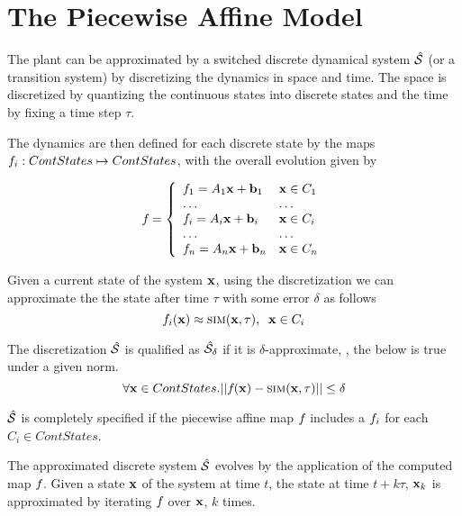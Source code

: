 \section{The Piecewise Affine Model}

The plant can be approximated by a switched discrete dynamical system
$\hat{\mathcal{S}}$ (or a transition system) by discretizing the dynamics in
space and time. The space is discretized by quantizing the continuous
states into discrete states and the time by fixing a time step $\tau$.

The dynamics are then defined for each discrete state by the maps
$f_{i}: ContStates \mapsto ContStates$, with the overall evolution
given by

\begin{equation}
    f_{} = \left\{
        \begin{array}{ll}
            f_{1} = A_1\mathbf{x} + \mathbf{b}_1 & \mathbf{x} \in C_1\\
            \ldots & \ldots\\
            f_{i} = A_i\mathbf{x} + \mathbf{b}_i & \mathbf{x} \in C_i\\
            \ldots & \ldots\\
            f_{n} = A_n\mathbf{x} + \mathbf{b}_n & \mathbf{x} \in C_n
        \end{array}
    \right.
\end{equation}

Given a current state of the system $\mathbf{x}$, using the discretization we
can approximate the the state after time $\tau$ with some error
$\delta$ as follows
\begin{equation}
    f_{i}(\mathbf{x}) \approx \mbox{\sc sim}(\mathbf{x}, \tau),\;\; \mathbf{x} \in C_i
\end{equation}

The discretization $\hat{\mathcal{S}}$ is qualified as $\hat{\mathcal{S}}_\delta$
if it is $\delta$-approximate, \ie, the below is true under a given
norm.
\begin{equation}
    \forall \mathbf{x} \in ContStates.
        ||f_{}(\mathbf{x}) - \mbox{\sc sim}(\mathbf{x}, \tau)|| \le \delta
\end{equation}

$\hat{\mathcal{S}}$ is completely specified if the piecewise affine map
$f_{}$ includes a $f_{i}$ for each $C_i \in ContStates$.

The approximated discrete system $\hat{\mathcal{S}}$ evolves by the
application of the computed map $f_{}$. Given a state $\mathbf{x}$ of the system
at time $t$, the state at time $t + k\tau$, $\mathbf{x}_k$ is approximated by
iterating $f_{}$ over $\mathbf{x}$, $k$ times.


